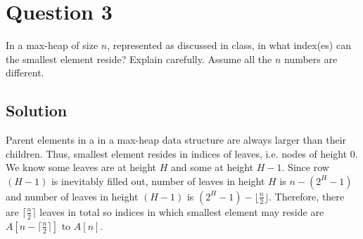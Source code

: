 
\section*{Question 3}

In a max-heap of size $n$, represented as discussed in class, in what index(es) can the smallest element reside? Explain carefully. Assume all the $n$ numbers are different.

\subsection*{Solution}

Parent elements in a in a max-heap data structure are always larger than their children. Thus, smallest element resides in indices of leaves, i.e. nodes of height $0$. We know some leaves are at height $H$ and some at height $H-1$. Since row $(H-1)$ is inevitably filled out, number of leaves in height $H$ is $n - (2^H - 1)$ and number of leaves in height $(H-1)$ is $(2^H-1)-\lfloor \frac{n}{2} \rfloor$. Therefore, there are $\lceil \frac{n}{2} \rceil$ leaves in total so indices in which smallest element may reside are $A[n - \lceil \frac{n}{2} \rceil]$ to $A[n]$.
